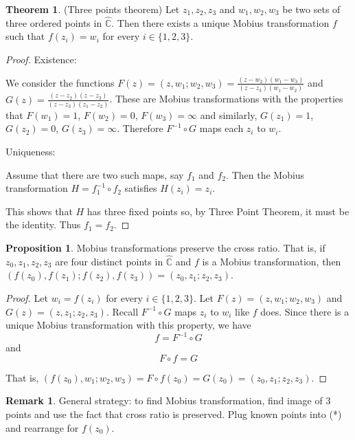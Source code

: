 \documentclass[12pt,a4paper]{article}
\theoremstyle{definition}
\newtheorem{theorem}[definition]{Theorem}
\newtheorem{proposition}[definition]{Proposition}
\newtheorem*{remark}{Remark}
\begin{document}
\begin{theorem}
	(Three points theorem)
	Let ${z_1, z_2, z_3}$ and ${w_1, w_2, w_3}$ be two sets of three ordered points in $\hat{\mathbb{C}}$. Then there exists a unique Mobius transformation $f$ such that $f(z_i) = w_i$ for every $i \in \{1, 2, 3\}$.
\end{theorem}

\begin{proof}
	Existence:

	We consider the functions $F(z) = (z, w_1; w_2, w_3) = \frac{(z - w_2)(w_1 - w_3)}{(z - z_3)(w_1 - w_2)}$ and $G(z) = \frac{(z - z_2)(z - z_3)}{(z - z_3)(z_1 - z_2)}$. These are Mobius transformations with the properties that $F(w_1) = 1$, $F(w_2) = 0$, $F(w_3) = \infty$ and similarly, $G(z_1) = 1$, $G(z_2) = 0$, $G(z_3) = \infty$. Therefore $F^{-1} \circ G$ maps each $z_i$ to $w_i$.

	Uniqueness:

	Assume that there are two such maps, say $f_1$ and $f_2$. Then the Mobius transformation $H = f_1 ^ {-1} \circ f_2$ satisfies $H(z_i) = z_i$.

	This shows that $H$ has three fixed points so, by Three Point Theorem, it must be the identity. Thus $f_1 = f_2$.
\end{proof}

\begin{proposition}
	Mobius transformations preserve the cross ratio. That is, if $z_0, z_1, z_2, z_3$ are four distinct points in $\hat{\mathbb{C}}$ and $f$ is a Mobius transformation, then $(f(z_0), f(z_1); f(z_2), f(z_3)) = (z_0, z_1; z_2, z_3)$.
\end{proposition}

\begin{proof}
	Let $w_i = f(z_i)$ for every $i \in \{1, 2, 3\}$. Let $F(z) = (z, w_1; w_2, w_3)$ and $G(z) = (z, z_1; z_2, z_3)$. Recall $F^{-1} \circ G$ maps $z_i$ to $w_i$ like $f$ does. Since there is a unique Mobius transformation with this property, we have \[f = F^{-1} \circ G\] and \[F \circ f = G\]

	That is, $(f(z_0), w_1; w_2, w_3) = F \circ f (z_0) = G(z_0) = (z_0, z_1; z_2, z_3)$.
\end{proof}

\begin{remark}
	General strategy: to find Mobius transformation, find image of 3 points and use the fact that cross ratio is preserved. Plug known points into (*) and rearrange for $f(z_0)$.
\end{remark}
\end{document}
